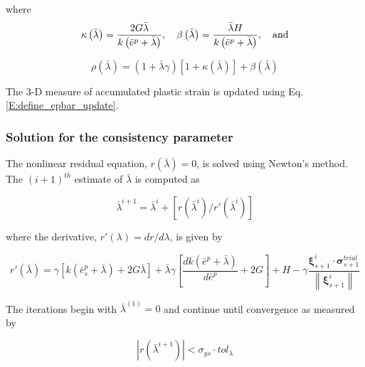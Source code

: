 \documentclass[11pt]{report}
\numberwithin{equation}{section}
\newcommand{\bmf } {\boldsymbol }
\begin{document}
\noindent where 
\begin{equation}
\kappa \left( {\bar \lambda } \right) = \frac{{2G\bar \lambda }}
{{k\left( {{\bar e^p} + \bar \lambda } \right)}}, \quad \beta \left( {\bar \lambda } \right) =
 \frac{{\bar \lambda H}}{{k\left( {{\bar e^p} + \bar \lambda } \right)}}, \quad \rm{and}
\end{equation}

\begin{equation}
\rho \left( {\bar \lambda } \right) = \left( {1 + \bar \lambda \gamma } \right)\left[ 
{1 + \kappa \left( {\bar \lambda } \right)} \right] + \beta \left( {\bar \lambda } \right)
\end{equation}

\noindent The 3-D measure of accumulated plastic strain is updated using 
Eq. \eqref{E:define_epbar_update}.

\subsubsection {Solution for the consistency parameter}
\noindent The nonlinear residual equation, $r (\bar \lambda)=0$, is solved using Newton's 
method. The $(i+1)^{th}$ estimate of $\bar \lambda$ is computed as

\begin{equation}
{\bar \lambda ^{i + 1}} = {\bar \lambda ^i} + \left[ {r\left( {{{\bar \lambda }^i}} 
\right) /r'\left( {{{\bar \lambda }^i}} \right)} \right]
\end{equation}

\noindent where the derivative, $r' \left( \lambda \right) = dr / d \lambda$, is given by

\begin{equation}
r'\left( {\bar \lambda } \right) = \gamma \left[ {k\left. 
{\left( {\bar e_s^p + \bar \lambda } \right.} \right) + 
2G\bar \lambda } \right] + \bar \lambda \gamma 
\left[ {\frac{{dk\left( {\bar e^p + \bar \lambda } \right)}}{{d\bar e^p}} 
+ 2G} \right] +  H - 
\gamma \frac{{\bmf\xi _{s + 1}^i \cdot 
\bmf\sigma _{s + 1}^{trial}}}{{\left\| {\bmf\xi _{s + 1}^i} \right\|}}
\end{equation}

\noindent The iterations begin with $\bar \lambda^{(1)} = 0$ and continue until convergence
as measured by

\begin{equation}
\left| {r\left( {{{\bar \lambda }^{i + 1}}} \right)} \right| < {\sigma _{ys}}\cdot to{l_\lambda }
\end{equation}
\end{document}

